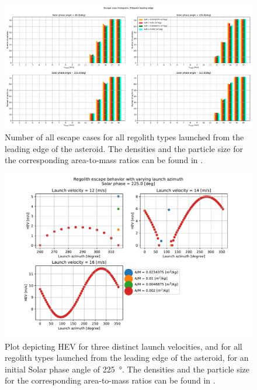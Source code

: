 \begin{figure}[htb]
\centering
\captionsetup{justification=centering}
\includegraphics[angle=90, width=\textwidth, height=\textheight, keepaspectratio=true]{leading_edge_perturbations/allEscapeCases.pdf}
\caption{Number of all escape cases for all regolith types launched from the leading edge of the asteroid. The densities and the particle size for the corresponding area-to-mass ratios can be found in .}
\label{fig:leadingEdge_allParticles_escape_hist}
\end{figure}
\FloatBarrier
\begin{figure}[htb]
\centering
\captionsetup{justification=centering}
\includegraphics[width=\textwidth, height=0.5\textheight, keepaspectratio=true]{leading_edge_perturbations/hev_255solarPhase.pdf}
\caption{Plot depicting \gls{HEV} for three distinct launch velocities, and for all regolith types launched from the leading edge of the asteroid, for an initial Solar phase angle of \SI{225}{\degree}. The densities and the particle size for the corresponding area-to-mass ratios can be found in .}
\label{fig:leadingEdge_allParticles_hev_225solarPhase}
\end{figure}
